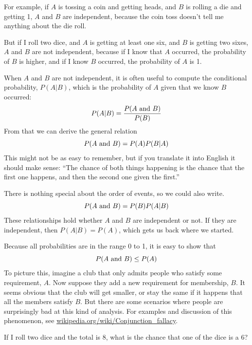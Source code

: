 \documentclass[12pt]{book}
\begin{document}

For example, if $A$ is tossing a coin and getting heads, and $B$
is rolling a die and getting 1, $A$ and $B$ are independent, because
the coin toss doesn't tell me anything about the die roll.


But if I roll two dice, and $A$ is getting at least one six, and
$B$ is getting two sixes, $A$ and $B$ are not independent, because
if I know that $A$ occurred, the probability of $B$ is higher, and
if I know $B$ occurred, the probability of $A$ is 1.


When $A$ and $B$ are not independent, it is often useful to compute
the conditional probability, $P(A|B)$, which is the probability of
$A$ given that we know $B$ occurred:
%
\[ P(A|B) = \frac{P(A ~\mbox{and}~ B)}{P(B)} \]
%
From that we can derive the general relation
%
\[ P(A ~\mbox{and}~ B) = P(A) P(B|A) \]
%
This might not be as easy to remember, but if you translate it into
English it should make sense: ``The chance of both things happening
is the chance that the first one happens, and then the second one
given the first.''

There is nothing special about the order of events, so we could also
write.
%
\[ P(A ~\mbox{and}~ B) = P(B) P(A|B) \]
%
These relationships hold whether $A$ and $B$ are independent or not.
If they are independent, then $P(A|B) = P(A)$, which gets us back
where we started.

Because all probabilities are in the range 0 to 1, it is
easy to show that 
%
\[ P(A ~\mbox{and}~ B) \le P(A) \]
%
To picture this, imagine a club that only admits people who satisfy
some requirement, $A$.  Now suppose they add a new requirement for
membership, $B$.  It seems obvious that the club will get smaller, or
stay the same if it happens that all the members satisfy $B$.  But
there are some scenarios where people are surprisingly bad at this
kind of analysis.  For examples and discussion of this phenomenon, see
\url{wikipedia.org/wiki/Conjunction_fallacy}.


\begin{ex}

If I roll two dice and the total is 8, what is the chance that
one of the dice is a 6?
\end{ex}
\end{document}

